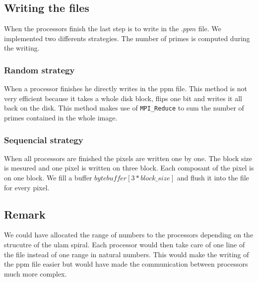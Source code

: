\subsection{Writing the files}
When the processors finish the last step is to write in the $.ppm$ file. We implemented two differents strategies. The number of primes is computed during the writing.

\subsubsection{Random strategy}
When a processor finishes he directly writes in the ppm file. This method is not very efficient because it takes a whole disk block, flips one bit and writes it all back on the disk. This method makes use of \verb+MPI_Reduce+ to sum the number of primes contained in the whole image.

\subsubsection{Sequencial strategy}
When all processors are finished the pixels are written one by one. The block size is mesured and one pixel is written on three block. Each composant of the pixel is on one block. We fill a buffer $byte buffer[3*block\_size]$ and flush it into the file for every pixel.

\subsection{Remark}
We could have allocated the range of numbers to the processors depending on the strucutre of the ulam spiral. Each processor would then take care of one line of the file instead of one range in natural numbers. This would make the writing of the ppm file easier but would have made the communication between processors much more complex.